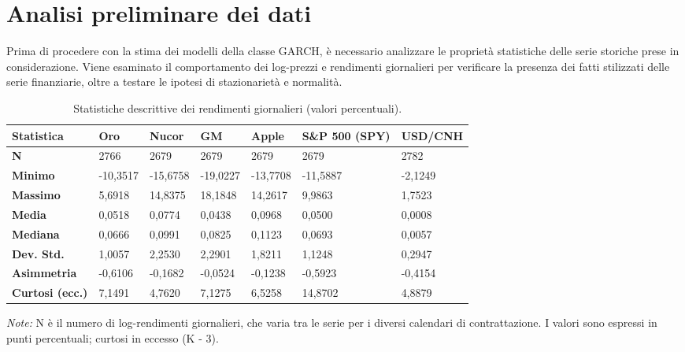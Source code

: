 \section{Analisi preliminare dei dati}
Prima di procedere con la stima dei modelli della classe GARCH, è necessario analizzare le proprietà statistiche delle serie storiche prese in considerazione. Viene 
esaminato il comportamento dei log-prezzi e rendimenti giornalieri per verificare la presenza dei fatti stilizzati delle serie finanziarie, oltre a testare le ipotesi 
di stazionarietà e normalità.

\begin{table}[H]
    \centering
    \footnotesize
    \begin{tabular}{ p{} p{} p{} p{} p{} p{} p{} }
        \toprule
        \textbf{Statistica} & \textbf{Oro} & \textbf{Nucor} & \textbf{GM} & \textbf{Apple} & \textbf{S\&P 500 (SPY)} & \textbf{USD/\newline CNH} \\
        \midrule
        \textbf{N} & 2766 & 2679 & 2679 & 2679 & 2679 & 2782 \\ \midrule
        \textbf{Minimo} & -10,3517 & -15,6758 & -19,0227 & -13,7708 & -11,5887 & -2,1249 \\ \midrule
        \textbf{Massimo} & 5,6918 & 14,8375 & 18,1848 & 14,2617 & 9,9863 & 1,7523 \\ \midrule
        \textbf{Media} & 0,0518 & 0,0774 & 0,0438 & 0,0968 & 0,0500 & 0,0008 \\ \midrule
        \textbf{Mediana} & 0,0666 & 0,0991 & 0,0825 & 0,1123 & 0,0693 & 0,0057 \\ \midrule
        \textbf{Dev. Std.} & 1,0057 & 2,2530 & 2,2901 & 1,8211 & 1,1248 & 0,2947 \\ \midrule
        \textbf{Asimmetria} & -0,6106 & -0,1682 & -0,0524 & -0,1238 & -0,5923 & -0,4154 \\ \midrule
        \textbf{Curtosi (ecc.)} & 7,1491 & 4,7620 & 7,1275 & 6,5258 & 14,8702 & 4,8879 \\
        \bottomrule
    \end{tabular}
    \vspace{5pt}
    \caption[Statistiche descrittive dei log-rendimenti giornalieri]{Statistiche descrittive dei rendimenti giornalieri (valori percentuali).}
    \label{tab:stat-descrittive}
    \vspace{2pt}
    \begin{flushleft}
    \emph{Note:} N è il numero di log-rendimenti giornalieri, che varia tra le serie per i diversi calendari di contrattazione. I valori sono espressi in punti percentuali; curtosi in eccesso (K - 3).
    \end{flushleft}
\end{table}


